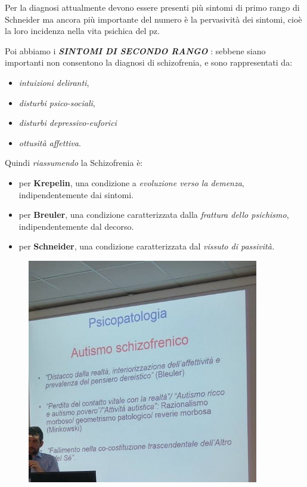 Per la diagnosi attualmente devono essere presenti più sintomi di primo
rango di Schneider ma ancora più importante del numero è la pervasività
dei sintomi, cioè la loro incidenza nella vita psichica del pz.


Poi abbiamo i \textbf{\emph{SINTOMI DI SECONDO RANGO}} : sebbene siano
importanti non consentono la diagnosi di schizofrenia, e sono
rappresentati da:

\begin{itemize}
\item
  \emph{intuizioni deliranti},
\item
  \emph{disturbi psico-sociali},
\item
  \emph{disturbi depressivo-euforici}
\item
  \emph{ottusità affettiva}.
\end{itemize}


Quindi \emph{riassumendo} la Schizofrenia è:

\begin{itemize}
\item
  per \textbf{Krepelin}, una condizione a \emph{evoluzione verso la
  demenza}, indipendentemente dai sintomi.
\item
  per \textbf{Breuler}, una condizione caratterizzata dalla
  \emph{frattura dello psichismo}, indipendentemente dal decorso.
\item
  per \textbf{Schneider}, una condizione caratterizzata dal
  \emph{vissuto di passività.}
\end{itemize}

\begin{figure}[!ht]
\centering
	\includegraphics[width=0.9\textwidth]{06/image4.jpeg}
\end{figure}


